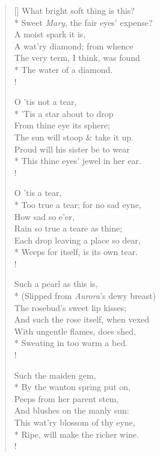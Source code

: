 \documentclass[MAIN]{subfiles}
\begin{document}
\settowidth{\versewidth}{\vin What bright soft thing is this?}
\begin{verse}[\versewidth]
\vin What bright soft thing is this?\\*
Sweet \emph{Mary}, the fair eyes' expense?\\
\vin A moist spark it is,\\
A wat'ry diamond; from whence\\
The very term, I think, was found\\*
The water of a diamond.\\!

\vin O 'tis not a tear,\\*
'Tis a star about to drop\\
\vin From thine eye its sphere;\\
The sun will stoop \& take it up.\\
Proud will his sister be to wear\\*
This thine eyes' jewel in her ear.\\!

\vin O 'tis a tear,\\*
Too true a tear; for no sad eyne,\\
\vin How sad so e'er,\\
Rain so true a teare as thine;\\
Each drop leaving a place so dear,\\*
Weeps for itself, is its own tear.\\!

\vin Such a pearl as this is,\\*
(Slipped from \emph{Aurora}'s dewy breast)\\
\vin The rosebud's sweet lip kisses;\\
And such the rose itself, when vexed\\
With ungentle flames, does shed,\\*
Sweating in too warm a bed.\\!

\vin Such the maiden gem,\\*
By the wanton spring put on,\\
\vin Peeps from her parent stem,\\
And blushes on the manly sun:\\
This wat'ry blossom of thy eyne,\\*
Ripe, will make the richer wine.\\!


\end{verse}
\end{document}

